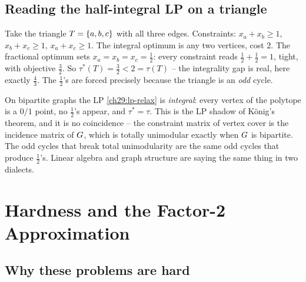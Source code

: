 \subsection{Reading the half-integral LP on a triangle}

Take the triangle $T=\{a,b,c\}$ with all three edges. Constraints:
$x_a+x_b\ge1$, $x_b+x_c\ge1$, $x_a+x_c\ge1$. The integral optimum is any two
vertices, cost $2$. The fractional optimum sets $x_a=x_b=x_c=\tfrac12$: every
constraint reads $\tfrac12+\tfrac12=1$, tight, with objective $\tfrac32$. So
$\tau^*(T)=\tfrac32<2=\tau(T)$ -- the integrality gap is real, here exactly
$\tfrac43$. The $\tfrac12$'s are forced precisely because the triangle is an
\emph{odd} cycle.

\begin{center}
\end{center}

\begin{connectionbox}
On bipartite graphs the LP \eqref{ch29:lp-relax} is \emph{integral}: every vertex
of the polytope is a $0/1$ point, no $\tfrac12$'s appear, and $\tau^*=\tau$. This
is the LP shadow of K\"onig's theorem, and it is no coincidence -- the constraint
matrix of vertex cover is the incidence matrix of $G$, which is totally
unimodular exactly when $G$ is bipartite. The odd cycles that break total
unimodularity are the same odd cycles that produce $\tfrac12$'s. Linear algebra
and graph structure are saying the same thing in two dialects.
\end{connectionbox}

\section{Hardness and the Factor-2 Approximation}
\label{ch29:hardness}

\subsection{Why these problems are hard}

